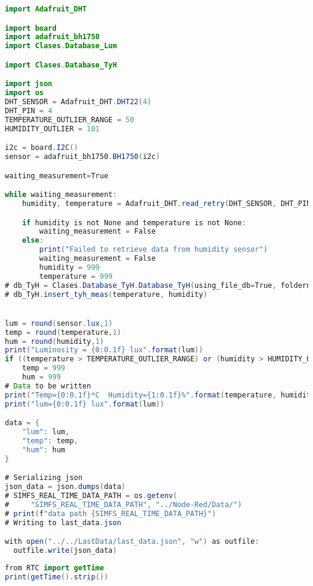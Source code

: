 \begin{lstlisting}[language=Java]
import Adafruit_DHT

import board
import adafruit_bh1750
import Clases.Database_Lum

import Clases.Database_TyH

import json
import os
DHT_SENSOR = Adafruit_DHT.DHT22(4)
DHT_PIN = 4
TEMPERATURE_OUTLIER_RANGE = 50
HUMIDITY_OUTLIER = 101

i2c = board.I2C()
sensor = adafruit_bh1750.BH1750(i2c)

waiting_measurement=True

while waiting_measurement:
    humidity, temperature = Adafruit_DHT.read_retry(DHT_SENSOR, DHT_PIN)

    if humidity is not None and temperature is not None:
        waiting_measurement = False
    else:
        print("Failed to retrieve data from humidity sensor")
        waiting_measurement = False
        humidity = 999
        temperature = 999
# db_TyH = Clases.Database_TyH.Database_TyH(using_file_db=True, foldername='db')#Importante el foldername
# db_TyH.insert_tyh_meas(temperature, humidity)


lum = round(sensor.lux,1)
temp = round(temperature,1)
hum = round(humidity,1)
print("Luminosity = {0:0.1f} lux".format(lum))
if ((temperature > TEMPERATURE_OUTLIER_RANGE) or (humidity > HUMIDITY_OUTLIER)):
    temp = 999
    hum = 999
# Data to be written
print("Temp={0:0.1f}*C  Humidity={1:0.1f}%".format(temperature, humidity))
print("lum={0:0.1f} lux".format(lum))

data = {
    "lum": lum,
    "temp": temp,
    "hum": hum
}

# Serializing json
json_data = json.dumps(data)
# SIMFS_REAL_TIME_DATA_PATH = os.getenv(
#     "SIMFS_REAL_TIME_DATA_PATH", "../Node-Red/Data/")
# print(f"data path {SIMFS_REAL_TIME_DATA_PATH}")
# Writing to last_data.json

with open("../../LastData/last_data.json", "w") as outfile:
  outfile.write(json_data)

\end{lstlisting}

\begin{lstlisting}[language=Java]
from RTC import getTime
print(getTime().strip())

\end{lstlisting}


